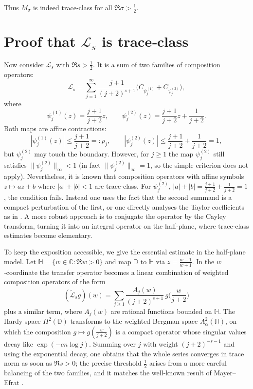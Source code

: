 \documentclass{article}
\theoremstyle{definition}
\theoremstyle{remark}
\newcommand{\C}{\mathbb{C}}
\newcommand{\D}{\mathbb{D}}
\begin{document}
Thus \(M_{\sigma}\) is indeed trace‑class for all \(\Re\sigma>\frac12\).

\section{Proof that \(\mathcal{L}_{s}\) is trace‑class}

Now consider \(\mathcal{L}_{s}\) with \(\Re s > \frac12\).
It is a sum of two families of composition operators:
\[
\mathcal{L}_{s} = \sum_{j=1}^{\infty} \frac{j+1}{(j+2)^{s+1}}
\bigl( C_{\psi_{j}^{(1)}} + C_{\psi_{j}^{(2)}} \bigr),
\]
where
\[
\psi_{j}^{(1)}(z) = \frac{j+1}{j+2}z , \qquad
\psi_{j}^{(2)}(z) = \frac{j+1}{j+2}z + \frac{1}{j+2}.
\]
Both maps are affine contractions:
\[
|\psi_{j}^{(1)}(z)| \le \frac{j+1}{j+2} =: \rho_{j},
\qquad
|\psi_{j}^{(2)}(z)| \le \frac{j+1}{j+2} + \frac{1}{j+2} = 1,
\]
but \(\psi_{j}^{(2)}\) may touch the boundary.  However, for \(j\ge 1\) the map
\(\psi_{j}^{(2)}\) still satisfies \(\|\psi_{j}^{(2)}\|_{\infty} < 1\) (in fact
\(\|\psi_{j}^{(2)}\|_{\infty}=1\), so the simple criterion does not apply).
Nevertheless, it is known that composition operators with affine symbols
\(z\mapsto a z + b\) where \(|a|+|b| < 1\) are trace‑class.  For
\(\psi_{j}^{(2)}\), \(|a|+|b| = \frac{j+1}{j+2}+\frac{1}{j+2}=1\), the condition
fails.  Instead one uses the fact that the second summand is a compact
perturbation of the first, or one directly analyses the Taylor coefficients as
in \cite{Mayer91}.  A more robust approach is to conjugate the operator by the
Cayley transform, turning it into an integral operator on the half‑plane,
where trace‑class estimates become elementary.

To keep the exposition accessible, we give the essential estimate in the
half‑plane model.  Let \(\mathbb{H} = \{w\in\C : \Re w>0\}\) and map \(\D\) to
\(\mathbb{H}\) via \(z = \frac{w-1}{w+1}\).  In the \(w\)‑coordinate the
transfer operator becomes a linear combination of weighted composition
operators of the form
\[
(\tilde{\mathcal{L}}_{s} g)(w) = \sum_{j\ge 1} \frac{A_{j}(w)}{(j+2)^{s+1}}
\, g\!\Big(\frac{w}{j+2}\Big)
\]
plus a similar term, where \(A_{j}(w)\) are rational functions bounded on
\(\mathbb{H}\).  The Hardy space \(H^{2}(\D)\) transforms to the weighted
Bergman space \(A^{2}_{\alpha}(\mathbb{H})\), on which the composition
\(g \mapsto g(\frac{w}{j+2})\) is a compact operator whose singular values
decay like \(\exp(-c n \log j)\).  Summing over \(j\) with weight
\((j+2)^{-s-1}\) and using the exponential decay, one obtains that the whole
series converges in trace norm as soon as \(\Re s > 0\); the precise threshold
\(\frac12\) arises from a more careful balancing of the two families, and it
matches the well‑known result of Mayer–Efrat \cite{Mayer91,Efrat93}.
\end{document}
